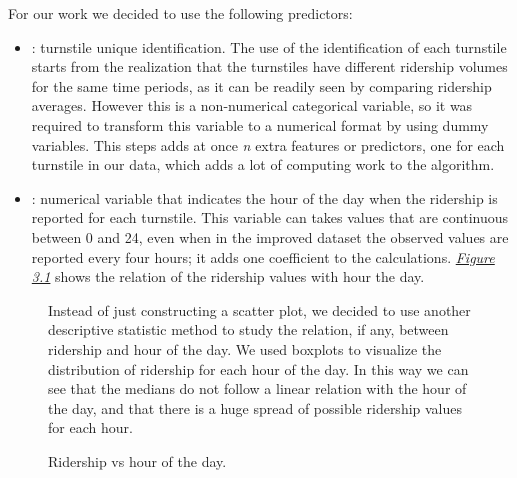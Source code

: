 \documentclass[a4paper,12pt,english]{sphinxmanual}
\begin{document}
For our work we decided to use the following predictors:
\begin{itemize}
\item {} 
: turnstile unique identification. The use of the identification
of each turnstile starts from the realization that the turnstiles have
different ridership volumes for the same time periods, as it can be readily
seen by comparing ridership averages. However this is a non-numerical
categorical variable, so it was required to transform this variable to a
numerical format by using dummy variables. This steps adds at once \emph{n} extra
features or predictors, one for each turnstile in our data, which adds a lot
of computing work to the algorithm.

\item {} 
: numerical variable that indicates the hour of the day when the
ridership is reported for each turnstile. This variable can takes values that
are continuous between 0 and 24, even when in the improved dataset the
observed values are reported every four hours; it adds one coefficient to
the calculations. {\hyperref[section2:figure31]{\emph{Figure 3.1}}} shows the relation of the
ridership values with hour the day.

\end{itemize}
\begin{figure}[htbp]
\centering
\capstart

\caption{Ridership vs hour of the day.}{\small 
Instead of just constructing a scatter plot, we decided to use another
descriptive statistic method to study the relation, if any, between ridership
and hour of the day. We used boxplots to visualize the distribution of
ridership for each hour of the day. In this way we can see that the medians
do not follow a linear relation with the hour of the day, and that there is a
huge spread of possible ridership values for each hour.
}\label{section2:figure31}\end{figure}
\end{document}
